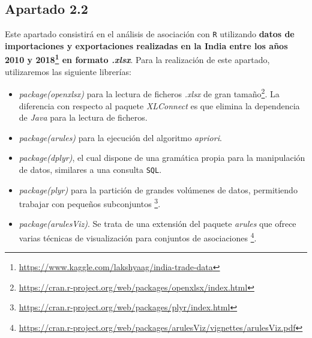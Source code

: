 \documentclass [a4paper] {article}
\begin{document}
\subsection{Apartado 2.2}
Este apartado consistirá en el análisis de asociación con \texttt{R} utilizando \textbf{datos de importaciones y exportaciones realizadas en la India entre los años 2010 y 
2018\footnote{\url{https://www.kaggle.com/lakshyaag/india-trade-data}} en formato \textit{.xlsx}}.
Para la realización de este apartado, utilizaremos las siguiente librerías:
\begin{itemize}
    \item \textit{package(openxlsx)} para la lectura de ficheros \textit{.xlsx} de gran tamaño\footnote{\url{https://cran.r-project.org/web/packages/openxlsx/index.html}}. La diferencia con respecto al paquete
    \textit{XLConnect} es que elimina la dependencia de \textit{Java} para la lectura de ficheros.
    \item \textit{package(arules)} para la ejecución del algoritmo \textit{apriori}.
    \item \textit{package(dplyr)}, el cual dispone de una gramática propia para la manipulación de datos, similares a una consulta \texttt{SQL}.
    \item \textit{package(plyr)} para la partición de grandes volúmenes de datos, permitiendo trabajar con pequeños subconjuntos \footnote{\url{https://cran.r-project.org/web/packages/plyr/index.html}}.
    \item \textit{package(arulesViz)}. Se trata de una extensión del paquete \textit{arules} que ofrece varias técnicas de visualización para conjuntos de asociaciones \footnote{\url{https://cran.r-project.org/web/packages/arulesViz/vignettes/arulesViz.pdf}}.
\end{itemize}
\end{document}

